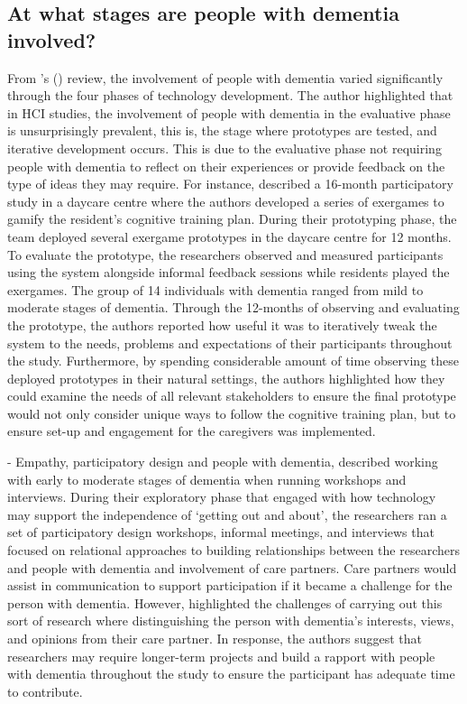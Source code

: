 \subsection{At what stages are people with dementia involved?}
\label{BL:DevelopmentPhases}
From \citeauthor{suijkerbuijk_active_2019}'s (\citeyear{suijkerbuijk_active_2019}) review, the involvement of people with dementia varied significantly through the four phases of technology development. The author highlighted that in HCI studies, the involvement of people with dementia in the evaluative phase is unsurprisingly prevalent, this is, the stage where prototypes are tested, and iterative development occurs. This is due to the evaluative phase not requiring people with dementia to reflect on their experiences or provide feedback on the type of ideas they may require. For instance, \cite{unbehaun_facilitating_2018} described a 16-month participatory study in a daycare centre where the authors developed a series of exergames to gamify the resident's cognitive training plan. During their prototyping phase, the team deployed several exergame prototypes in the daycare centre for 12 months. To evaluate the prototype, the researchers observed and measured participants using the system alongside informal feedback sessions while residents played the exergames. The group of 14 individuals with dementia ranged from mild to moderate stages of dementia. Through the 12-months of observing and evaluating the prototype, the authors reported how useful it was to iteratively tweak the system to the needs, problems and expectations of their participants throughout the study. Furthermore, by spending considerable amount of time observing these deployed prototypes in their natural settings, the authors highlighted how they could examine the needs of all relevant stakeholders to ensure the final prototype would not only consider unique ways to follow the cognitive training plan, but to ensure set-up and engagement for the caregivers was implemented. 

\cite{lindsay_empathy_2012} - Empathy, participatory design and people with dementia, described working with early to moderate stages of dementia when running workshops and interviews. During their exploratory phase that engaged with how technology may support the independence of `getting out and about', the researchers ran a set of participatory design workshops, informal meetings, and interviews that focused on relational approaches to building relationships between the researchers and people with dementia and involvement of care partners. Care partners would assist in communication to support participation if it became a challenge for the person with dementia. However, \cite{lindsay_empathy_2012} highlighted the challenges of carrying out this sort of research where distinguishing the person with dementia's interests, views, and opinions from their care partner. In response, the authors suggest that researchers may require longer-term projects and build a rapport with people with dementia throughout the study to ensure the participant has adequate time to contribute.

